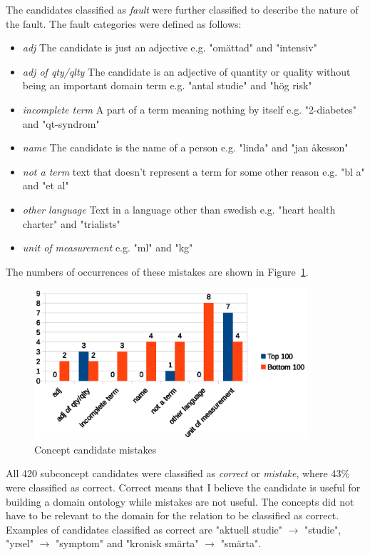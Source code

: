 \documentclass[a4paper]{report}
\begin{document}
The candidates classified as \emph{fault} were further classified to describe the nature of the fault.
The fault categories were defined as follows:
\begin{itemize}
  \item \emph{adj} The candidate is just an adjective e.g. "omättad" and "intensiv"
  \item \emph{adj of qty/qlty} The candidate is an adjective of quantity or quality without being an important domain term e.g. "antal studie" and "hög risk"
  \item \emph{incomplete term} A part of a term meaning nothing by itself e.g. "2-diabetes" and "qt-syndrom"
  \item \emph{name} The candidate is the name of a person e.g. "linda" and "jan åkesson"
  \item \emph{not a term} text that doesn't represent a term for some other reason e.g. "bl a" and "et al"
  \item \emph{other language} Text in a language other than swedish e.g. "heart health charter" and "trialists"
  \item \emph{unit of measurement} e.g. "ml" and "kg"
\end{itemize}
The numbers of occurrences of these mistakes are shown in Figure~\ref{fig:concept-cand-mistakes}.

\begin{figure}
  \centering
  \includegraphics[width=0.9\textwidth]{graphics/concepts-mistakes.eps}
  \caption{Concept candidate mistakes}
  \label{fig:concept-cand-mistakes}
\end{figure}

All 420 subconcept candidates were classified as \emph{correct} or \emph{mistake}, where 43\% were classified as correct.
Correct means that I believe the candidate is useful for building a domain ontology while mistakes are not useful.
The concepts did not have to be relevant to the domain for the relation to be classified as correct.
Examples of candidates classified as correct are "aktuell studie" \(\rightarrow\) "studie", "yrsel" \(\rightarrow\) "symptom" and "kronisk smärta" \(\rightarrow\) "smärta".
\end{document}
